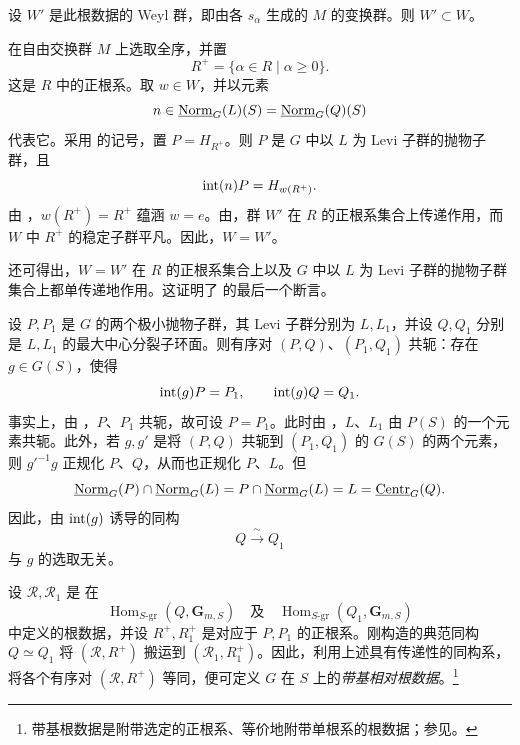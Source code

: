 
设 \(W'\) 是此根数据的 Weyl 群，即由各 \(s_\alpha\) 生成的 \(M\) 的变换群。则 \(W'\subset W\)。

在自由交换群 \(M\) 上选取全序，并置
\[
 R^+=\{\alpha\in R\mid\alpha\geq0\}.
\]
这是 \(R\) 中的正根系。取 \(w\in W\)，并以元素
\[
 n\in\underline{\operatorname{Norm}}_G(L)(S)=\underline{\operatorname{Norm}}_G(Q)(S)
\]
代表它。采用  的记号，置 \(P=H_{R^+}\)。则 \(P\) 是 \(G\) 中以 \(L\) 为 Levi 子群的抛物子群，且
\[
 \operatorname{int}(n)P=H_{w(R^+)}.
\]
由 ，\(w(R^+)=R^+\) 蕴涵 \(w=e\)。由，群 \(W'\) 在 \(R\) 的正根系集合上传递作用，而 \(W\) 中 \(R^+\) 的稳定子群平凡。因此，\(W=W'\)。

还可得出，\(W=W'\) 在 \(R\) 的正根系集合上以及 \(G\) 中以 \(L\) 为 Levi 子群的抛物子群集合上都单传递地作用。这证明了  的最后一个断言。
\SGAQED



设 \(P,P_1\) 是 \(G\) 的两个极小抛物子群，其 Levi 子群分别为 \(L,L_1\)，并设 \(Q,Q_1\) 分别是 \(L,L_1\) 的最大中心分裂子环面。则有序对 \((P,Q)\)、\((P_1,Q_1)\) 共轭：存在 \(g\in G(S)\)，使得
\[
 \operatorname{int}(g)P=P_1,\qquad \operatorname{int}(g)Q=Q_1.
\]
事实上，由 ，\(P\)、\(P_1\) 共轭，故可设 \(P=P_1\)。此时由 ，\(L\)、\(L_1\) 由 \(P(S)\) 的一个元素共轭。此外，若 \(g,g'\) 是将 \((P,Q)\) 共轭到 \((P_1,Q_1)\) 的 \(G(S)\) 的两个元素，则 \(g'^{-1}g\) 正规化 \(P\)、\(Q\)，从而也正规化 \(P\)、\(L\)。但
\[
 \underline{\operatorname{Norm}}_G(P)\cap\underline{\operatorname{Norm}}_G(L)
 =P\cap\underline{\operatorname{Norm}}_G(L)
 =L
 =\underline{\operatorname{Centr}}_G(Q).
\]
因此，由 \(\operatorname{int}(g)\) 诱导的同构
\[
 Q\xrightarrow{\ \sim\ }Q_1
\]
与 \(g\) 的选取无关。

设 \(\mathcal R,\mathcal R_1\) 是  在
\[
 \operatorname{Hom}_{S\text{-}\mathrm{gr}}(Q,\mathbf G_{m,S})
 \quad\text{及}\quad
 \operatorname{Hom}_{S\text{-}\mathrm{gr}}(Q_1,\mathbf G_{m,S})
\]
中定义的根数据，并设 \(R^+,R_1^+\) 是对应于 \(P,P_1\) 的正根系。刚构造的典范同构 \(Q\simeq Q_1\) 将 \((\mathcal R,R^+)\) 搬运到 \((\mathcal R_1,R_1^+)\)。因此，利用上述具有传递性的同构系，将各个有序对 \((\mathcal R,R^+)\) 等同，便可定义 \(G\) 在 \(S\) 上的\emph{带基相对根数据}。\footnote{带基根数据是附带选定的正根系、等价地附带单根系的根数据；参见。}

